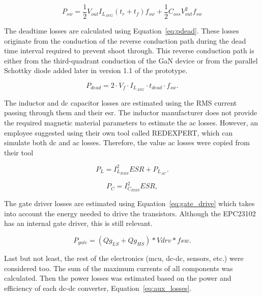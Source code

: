         \begin{equation}
        P_{sw}=\frac{1}{2}V_{out}I_{L_{AVG}}(t_r+t_f)f_{sw} + \frac{1}{2}C_{oss}V_{out}^{2}f_{sw}
        \label{eq:psw}
        \end{equation}

        The deadtime losses are calculated using Equation~\ref{eq:pdead}. These losses originate from the conduction of the reverse conduction path during the dead time interval required to prevent shoot through. This reverse conduction path is either from the third-quadrant conduction of the GaN device or from the parallel Schottky diode added later in version 1.1 of the prototype.

        \begin{equation}
        P_{dead}=2\cdot  V_f \cdot I_{L_{AVG}} \cdot t_{dead} \cdot f_{sw}.
        \label{eq:pdead}
        \end{equation}

        The inductor and \acs{dc} capacitor losses are estimated using the RMS current passing through them and their \ac{esr}. The inductor manufacturer does not provide the required magnetic material parameters to estimate the \acs{ac} losses. However, an employee suggested using their own tool called REDEXPERT, which can simulate both \acs{dc} and \acs{ac} losses. Therefore, the value \acs{ac} losses were copied from their tool

        \begin{equation}
        P_L=I_{L_{RMS}}^{2}ESR + P_{L_{AC}}.
        \end{equation}

        \begin{equation}
        P_C=I_{C_{RMS}}^{2}ESR,
        \end{equation}

        

        The gate driver losses are estimated using Equation~\ref{eq:gate_drive} which takes into account the energy needed to drive the transistors. Although the EPC23102 has an internal gate driver, this is still relevant.

        \begin{equation}
        P_{gate}= (Qg_{LS} + Qg_{HS})* Vdrv * fsw.
        \label{eq:gate_drive}
        \end{equation}

        Last but not least, the rest of the electronics (\acs{mcu}, \acs{dc}-\acs{dc}, sensors, etc.) were considered too. The sum of the maximum currents of all components was calculated. Then the power losses was estimated based on the power and efficiency of each \acs{dc}-\acs{dc} converter, Equation~\ref{eq:aux_losses}.

